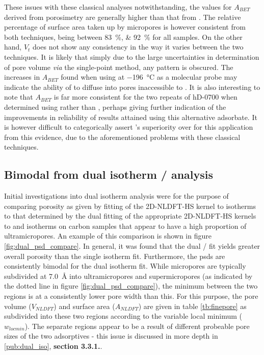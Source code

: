 These issues with these classical analyses notwithstanding, the values for $A_{BET}$ derived from  porosimetry are generally higher than that from . The relative percentage of surface area taken up by \glspl{micropore} is however consistent from both techniques, being between \qtylist[list-units=single]{83;92}{\percent} for all samples. On the other hand, $V_t$ does not show any consistency in the way it varies between the two techniques. It is likely that simply due to the large uncertainties in determination of pore volume \textit{via} the single-point method, any pattern is obscured. The increases in $A_{BET}$ found when using  at \qty{-196}{\degreeCelsius} as a molecular probe may indicate the ability of  to diffuse into pores inaccessible to . It is also interesting to note that $A_{BET}$ is far more consistent for the two repeats of hD-0700 when determined using  rather than , perhaps giving further indication of the improvements in reliability of results attained using this alternative \gls{adsorbate}. It is however difficult to categorically assert 's superiority over  for this application from this evidence, due to the aforementioned problems with these classical techniques. 
%
\subsection{\texorpdfstring{Bimodal  from dual isotherm / analysis}{Bimodal PSD from dual isotherm O2/H2 analysis}}%

Initial investigations into dual isotherm analysis were for the purpose of comparing porosity as given by fitting of the 2D-NLDFT-HS kernel to  isotherms to that determined by the dual fitting of the appropriate 2D-NLDFT-HS kernels to  and  isotherms on carbon samples that appear to have a high proportion of \glspl{ultramicropore}. An example of this comparison is shown in figure \ref{fig:dual_psd_compare}. In general, it was found that the dual / fit yields greater overall porosity than the single isotherm fit. Furthermore, the \acrshort{psd}s are consistently bimodal for the dual isotherm fit. While \glspl{micropore} are typically subdivided at \qty{7.0}{\angstrom} into \glspl{ultramicropore} and \glspl{supermicropore} (as indicated by the dotted line in figure \ref{fig:dual_psd_compare}), the minimum between the two regions is at a consistently lower pore width than this. For this purpose, the pore volume ($V_{NLDFT}$) and surface area ($A_{NLDFT}$) are given in table \ref{tb:finepore} as subdivided into these two regions according to the variable local minimum ($w_{locmin}$). The separate regions appear to be a result of different probeable pore sizes of the two adsorptives - this issue is discussed in more depth in \ref{pub:dual_iso}, \textbf{section 3.3.1.}. 

